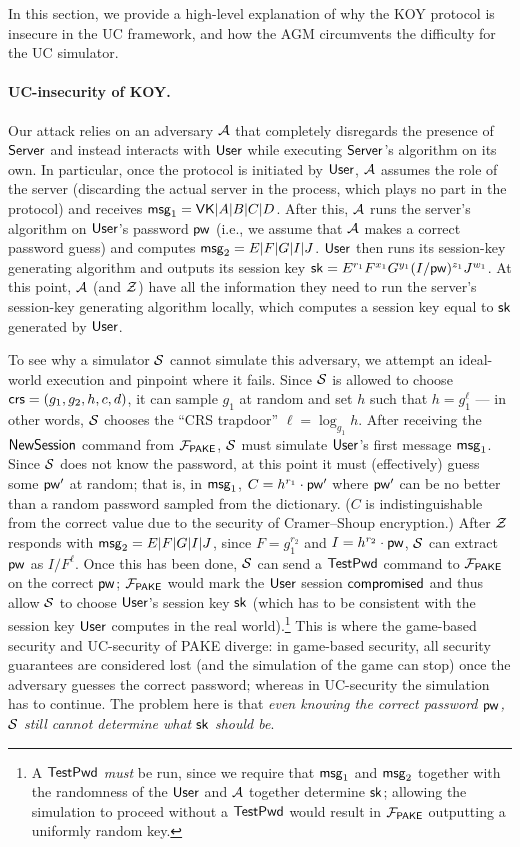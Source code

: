 In this section, we provide a high-level explanation of why the KOY protocol is insecure in the UC framework, and how the AGM circumvents the difficulty for the UC simulator.

\paragraph{UC-insecurity of KOY.}
Our attack relies on an adversary $\mathcal{A}$ that completely disregards the presence of $\mathsf{Server}$ and instead interacts with $\mathsf{User}$ while executing $\mathsf{Server}$'s algorithm on its own. In particular, once the protocol is initiated by $\mathsf{User}$, $\mathcal{A}$ assumes the role of the server (discarding the actual server in the process, which plays no part in the protocol) and receives $\mathsf{msg}_{1} = \mathsf{VK}|A|B|C|D$. After this, $\mathcal{A}$ runs the server's algorithm on $\mathsf{User}$'s password $\mathsf{pw}$ (i.e., we assume that $\mathcal{A}$ makes a correct password guess) and computes $\mathsf{msg}_{2} = E|F|G|I|J$. $\mathsf{User}$ then runs its session-key generating algorithm and outputs its session key $\mathsf{sk} = E^{r_1}F^{x_1}G^{y_1}(I/\mathsf{pw})^{z_1}J^{w_1}$. At this point, $\mathcal{A}$ (and $\mathcal{Z}$) have all the information they need to run the server's session-key generating algorithm locally, which computes a session key equal to $\mathsf{sk}$ generated by $\mathsf{User}$.

To see why a simulator $\mathcal{S}$ cannot simulate this adversary, we attempt an ideal-world execution and pinpoint where it fails. Since $\mathcal{S}$ is allowed to choose $\mathsf{crs}=(g_1, g_2, h, c, d)$, it can sample $g_1$ at random and set $h$ such that $h=g_1^{\ell}$ --- in other words, $\mathcal{S}$ chooses the ``CRS trapdoor'' $\ell = \log_{g_1} h$. After receiving the $\mathsf{NewSession}$ command from $\mathcal{F}_{\mathsf{PAKE}}$, $\mathcal{S}$ must simulate $\mathsf{User}$'s first message $\mathsf{msg}_{1}$. Since $\mathcal{S}$ does not know the password, at this point it must (effectively) guess some $\mathsf{pw}'$ at random; that is, in $\mathsf{msg}_{1}$, $C=h^{r_1}\cdot\mathsf{pw}'$ where $\mathsf{pw}'$ can be no better than a random password sampled from the dictionary. ($C$ is indistinguishable from the correct value due to the security of Cramer--Shoup encryption.) After $\mathcal{Z}$ responds with $\mathsf{msg}_{2} = E|F|G|I|J$, since $F = g_1^{r_2}$ and $I = h^{r_2} \cdot \mathsf{pw}$, $\mathcal{S}$ can extract $\mathsf{pw}$ as $I/F^\ell$. Once this has been done, $\mathcal{S}$ can send a $\mathsf{TestPwd}$ command to $\mathcal{F}_{\mathsf{PAKE}}$ on the correct $\mathsf{pw}$; $\mathcal{F}_{\mathsf{PAKE}}$ would mark the $\mathsf{User}$ session $\mathsf{compromised}$ and thus allow $\mathcal{S}$ to choose $\mathsf{User}$'s session key $\mathsf{sk}$ (which has to be consistent with the session key $\mathsf{User}$ computes in the real world).\footnote{A $\mathsf{TestPwd}$ \textit{must} be run, since we require that $\mathsf{msg}_{1}$ and $\mathsf{msg}_{2}$ together with the randomness of the $\mathsf{User}$ and $\mathcal{A}$ together determine $\mathsf{sk}$; allowing the simulation to proceed without a $\mathsf{TestPwd}$ would result in $\mathcal{F}_{\mathsf{PAKE}}$ outputting a uniformly random key.} This is where the game-based security and UC-security of PAKE diverge: in game-based security, all security guarantees are considered lost (and the simulation of the game can stop) once the adversary guesses the correct password; whereas in UC-security the simulation has to continue. The problem here is that \emph{even knowing the correct password $\mathsf{pw}$, $\mathcal{S}$ still cannot determine what $\mathsf{sk}$ should be}.

